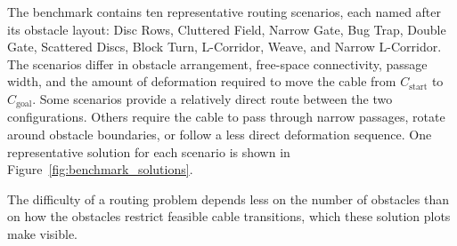 \documentclass{pas}
\begin{document}
The benchmark contains ten representative routing scenarios, each named after its obstacle layout: Disc Rows, Cluttered Field, Narrow Gate, Bug Trap, Double Gate, Scattered Discs, Block Turn, L-Corridor, Weave, and Narrow L-Corridor.
The scenarios differ in obstacle arrangement, free-space connectivity, passage width, and the amount of deformation required to move the cable from $C_{\mathrm{start}}$ to $C_{\mathrm{goal}}$.
Some scenarios provide a relatively direct route between the two configurations.
Others require the cable to pass through narrow passages, rotate around obstacle boundaries, or follow a less direct deformation sequence.
One representative solution for each scenario is shown in Figure~\ref{fig:benchmark_solutions}.

The difficulty of a routing problem depends less on the number of obstacles than on how the obstacles restrict feasible cable transitions, which these solution plots make visible.
\end{document}
